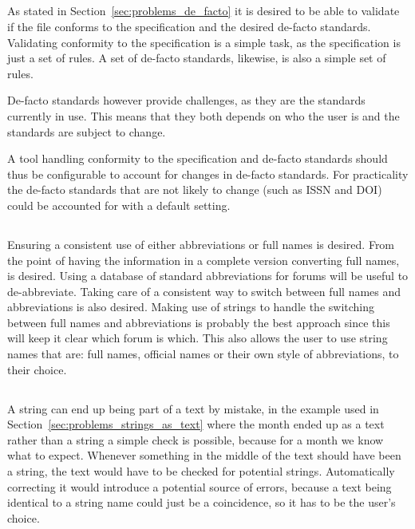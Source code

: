 \subsection{}

As stated in Section~\ref{sec:problems_de_facto} it is desired to be
able to validate if the file conforms to the specification and the
desired de-facto standards.  Validating conformity to the
specification is a simple task, as the specification is just a set of
rules.  A set of de-facto standards, likewise, is also a simple set of
rules.

De-facto standards however provide challenges, as they are the
standards currently in use.  This means that they both depends on who
the user is and the standards are subject to change.

A tool handling conformity to the specification and de-facto standards
should thus be configurable to account for changes in de-facto
standards.  For practicality the de-facto standards that are not
likely to change (such as ISSN and DOI) could be accounted for with a
default setting.


\subsection{}

Ensuring a consistent use of either abbreviations or full names is
desired.  From the point of having the information in a complete
version converting full names,  is desired.
Using a database of standard abbreviations for forums will be useful
to de-abbreviate.  Taking care of a consistent way to switch between
full names and abbreviations is also desired.  Making use of strings
to handle the switching between full names and abbreviations is
probably the best approach since this will keep it clear which forum
is which.  This also allows the user to use string names that are:
full names, official names or their own style of abbreviations, to
their choice.


\subsection{}

A {\bibtex} string can end up being part of a text by mistake, in the
example used in Section~\ref{sec:problems_strings_as_text} where the
month ended up as a text rather than a string a simple check is
possible, because for a month we know what to expect.  Whenever
something in the middle of the text should have been a string, the
text would have to be checked for potential strings.  Automatically
correcting it would introduce a potential source of errors, because a
text being identical to a string name could just be a coincidence, so
it has to be the user's choice.


